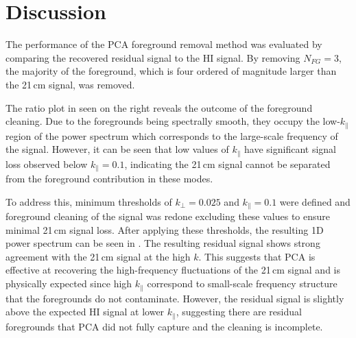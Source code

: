 \section{Discussion}

The performance of the PCA foreground removal method was evaluated by comparing the recovered residual signal to the HI signal. By removing $N_{FG} = 3$, the majority of the foreground, which is four ordered of magnitude larger than the 21\,cm signal, was removed. 

The ratio plot in  seen on the right reveals the outcome of the foreground cleaning. Due to the foregrounds being spectrally smooth, they occupy the low-$k_\parallel$ region of the power spectrum which corresponds to the large-scale frequency of the signal. However, it can be seen that low values of $k_\parallel$ have significant signal loss observed below $k_\parallel = 0.1$, indicating the 21\,cm signal cannot be separated from the foreground contribution in these modes. %

To address this, minimum thresholds of $k_\perp = 0.025$ and $k_\parallel = 0.1$ were defined and foreground cleaning of the signal was redone excluding these values to ensure minimal 21\,cm signal loss. After applying these thresholds, the resulting 1D power spectrum can be seen in . The resulting residual signal shows strong agreement with the 21\,cm signal at the high $k$. This suggests that PCA is effective at recovering the high-frequency fluctuations of the 21\,cm signal and is physically expected since high $k_\parallel$ correspond to small-scale frequency structure that the foregrounds do not contaminate. However, the residual signal is slightly above the expected HI signal at lower $k_\parallel$, suggesting there are residual foregrounds that PCA did not fully capture and the cleaning is incomplete.


